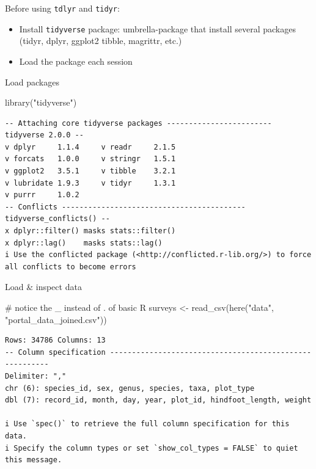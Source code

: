 \documentclass[
  letterpaper,
  DIV=11,
  numbers=noendperiod]{scrreprt}
\newenvironment{Shaded}{\begin{snugshade}}{\end{snugshade}}
\newcommand{\CommentTok}[1]{\textcolor[rgb]{0.37,0.37,0.37}{#1}}
\newcommand{\FunctionTok}[1]{\textcolor[rgb]{0.28,0.35,0.67}{#1}}
\newcommand{\NormalTok}[1]{\textcolor[rgb]{0.00,0.23,0.31}{#1}}
\newcommand{\OtherTok}[1]{\textcolor[rgb]{0.00,0.23,0.31}{#1}}
\newcommand{\StringTok}[1]{\textcolor[rgb]{0.13,0.47,0.30}{#1}}
\providecommand{\tightlist}{%
  \setlength{\itemsep}{0pt}\setlength{\parskip}{0pt}}\usepackage{longtable,booktabs,array}
\begin{document}
Before using \texttt{tdlyr} and \texttt{tidyr}:

\begin{itemize}
\tightlist
\item
  Install \texttt{tidyverse} package: umbrella-package that install
  several packages (tidyr, dplyr, ggplot2 tibble, magrittr, etc.)
\item
  Load the package each session
\end{itemize}

Load packages

\begin{Shaded}
\begin{Highlighting}[]
\FunctionTok{library}\NormalTok{(}\StringTok{"tidyverse"}\NormalTok{)}
\end{Highlighting}
\end{Shaded}

\begin{verbatim}
-- Attaching core tidyverse packages ------------------------ tidyverse 2.0.0 --
v dplyr     1.1.4     v readr     2.1.5
v forcats   1.0.0     v stringr   1.5.1
v ggplot2   3.5.1     v tibble    3.2.1
v lubridate 1.9.3     v tidyr     1.3.1
v purrr     1.0.2     
-- Conflicts ------------------------------------------ tidyverse_conflicts() --
x dplyr::filter() masks stats::filter()
x dplyr::lag()    masks stats::lag()
i Use the conflicted package (<http://conflicted.r-lib.org/>) to force all conflicts to become errors
\end{verbatim}

Load \& inspect data

\begin{Shaded}
\begin{Highlighting}[]
\CommentTok{\# notice the \textquotesingle{}\_\textquotesingle{} instead of \textquotesingle{}.\textquotesingle{} of basic R}
\NormalTok{surveys }\OtherTok{\textless{}{-}} \FunctionTok{read\_csv}\NormalTok{(}\FunctionTok{here}\NormalTok{(}\StringTok{"data"}\NormalTok{, }\StringTok{"portal\_data\_joined.csv"}\NormalTok{))}
\end{Highlighting}
\end{Shaded}

\begin{verbatim}
Rows: 34786 Columns: 13
-- Column specification --------------------------------------------------------
Delimiter: ","
chr (6): species_id, sex, genus, species, taxa, plot_type
dbl (7): record_id, month, day, year, plot_id, hindfoot_length, weight

i Use `spec()` to retrieve the full column specification for this data.
i Specify the column types or set `show_col_types = FALSE` to quiet this message.
\end{verbatim}
\end{document}
